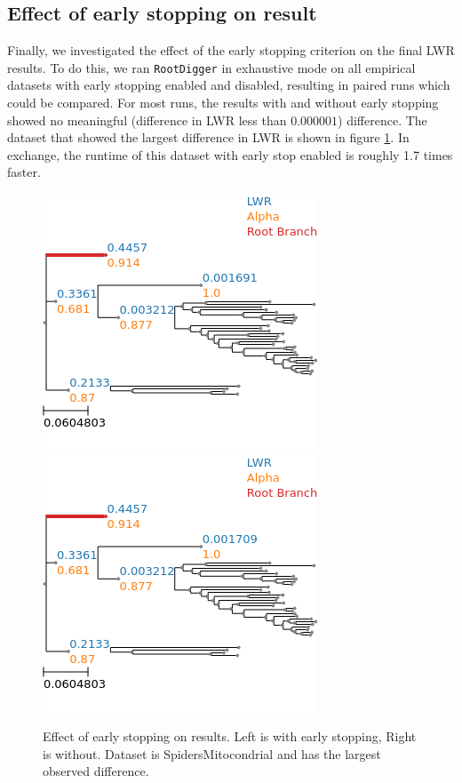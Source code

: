 \documentclass{article}
\newcommand{\RootDiggertt}{\texttt{RootDigger}}
\begin{document}
\subsection{Effect of early stopping on result}

Finally, we investigated the effect of the early stopping criterion on the final
LWR results. To do this, we ran \RootDiggertt{} in exhaustive mode on all
empirical datasets with early stopping enabled and disabled, resulting in paired
runs which could be compared. For most runs, the results with and without early
stopping showed no meaningful (difference in LWR less than $0.000001$)
difference. The dataset that showed the largest difference in LWR is shown in
figure \ref{fig:es_mito}. In exchange, the runtime of this dataset with early
stop enabled is roughly 1.7 times faster.


\begin{figure}[H]
  \begin{center}
    \includegraphics[width=.4\linewidth]{figs/early_stop_tests/es_test_mito_no_outgroup.png}
    \includegraphics[width=.4\linewidth]{figs/early_stop_tests/es_test_mito_no_outgroup_noes.png}
    \caption{Effect of early stopping on results. Left is with early stopping,
    Right is without. Dataset is SpidersMitocondrial and has the largest
  observed difference.}
    \label{fig:es_mito}
  \end{center}
\end{figure}
\end{document}
